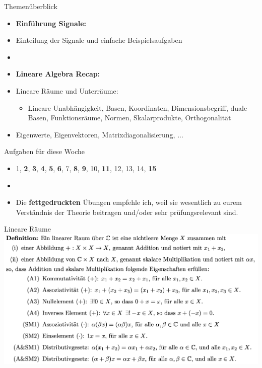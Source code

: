 \documentclass[14pt, aspectratio=169, handout]{beamer}
\begin{document}
\begin{frame}{Themenüberblick}
    \begin{itemize}
    \item \textbf{Einführung Signale:}
    \item[] Einteilung der Signale und einfache Beispielsaufgaben
    \item[] 
    \item \textbf{Lineare Algebra Recap:}
    \item[] Lineare Räume und Unterräume: \begin{itemize}
        \item[] Lineare Unabhängigkeit, Basen, Koordinaten, Dimensionsbegriff, duale Basen, Funktionsräume, Normen, Skalarprodukte, Orthogonalität
    \end{itemize}
    \item[] Eigenwerte, Eigenvektoren, Matrixdiagonalisierung, ...
\end{itemize}
\end{frame}

\begin{frame}{Aufgaben für diese Woche}
    \begin{itemize}
        \item[] 1, \textbf{2}, \textbf{3}, \textbf{4}, \textbf{5}, \textbf{6}, 7, \textbf{8}, \textbf{9}, 10, \textbf{11}, 12, 13, 14, \textbf{15}
        \item[] 
        \item[] Die \textbf{fettgedruckten} Übungen empfehle ich, weil sie wesentlich zu eurem Verständnis der Theorie beitragen und/oder sehr prüfungsrelevant sind.
    \end{itemize}
\end{frame}


\begin{frame}{Lineare Räume}
    \includegraphics[width=\linewidth]{figures/linearer_raum.png}
\end{frame}
\end{document}
